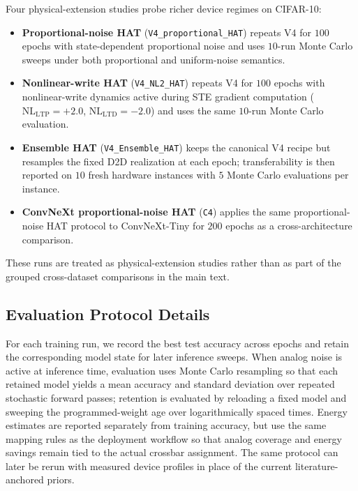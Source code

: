 Four physical-extension studies probe richer device regimes on CIFAR-10:
\begin{itemize}[leftmargin=1.4em,itemsep=2pt,topsep=2pt]
    \item \textbf{Proportional-noise HAT} (\texttt{V4\_proportional\_HAT}) repeats V4 for \(100\) epochs with state-dependent proportional noise and uses \(10\)-run Monte Carlo sweeps under both proportional and uniform-noise semantics.
    \item \textbf{Nonlinear-write HAT} (\texttt{V4\_NL2\_HAT}) repeats V4 for \(100\) epochs with nonlinear-write dynamics active during STE gradient computation (\(\mathrm{NL}_{\mathrm{LTP}}=+2.0\), \(\mathrm{NL}_{\mathrm{LTD}}=-2.0\)) and uses the same \(10\)-run Monte Carlo evaluation.
    \item \textbf{Ensemble HAT} (\texttt{V4\_Ensemble\_HAT}) keeps the canonical V4 recipe but resamples the fixed D2D realization at each epoch; transferability is then reported on \(10\) fresh hardware instances with \(5\) Monte Carlo evaluations per instance.
    \item \textbf{ConvNeXt proportional-noise HAT} (\texttt{C4}) applies the same proportional-noise HAT protocol to ConvNeXt-Tiny for \(200\) epochs as a cross-architecture comparison.
\end{itemize}
These runs are treated as physical-extension studies rather than as part of the grouped cross-dataset comparisons in the main text.

\subsection{Evaluation Protocol Details}
\label{subsec:eval-protocol-details}

For each training run, we record the best test accuracy across epochs and retain the corresponding model state for later inference sweeps. When analog noise is active at inference time, evaluation uses Monte Carlo resampling so that each retained model yields a mean accuracy and standard deviation over repeated stochastic forward passes; retention is evaluated by reloading a fixed model and sweeping the programmed-weight age over logarithmically spaced times. Energy estimates are reported separately from training accuracy, but use the same mapping rules as the deployment workflow so that analog coverage and energy savings remain tied to the actual crossbar assignment. The same protocol can later be rerun with measured device profiles in place of the current literature-anchored priors.

